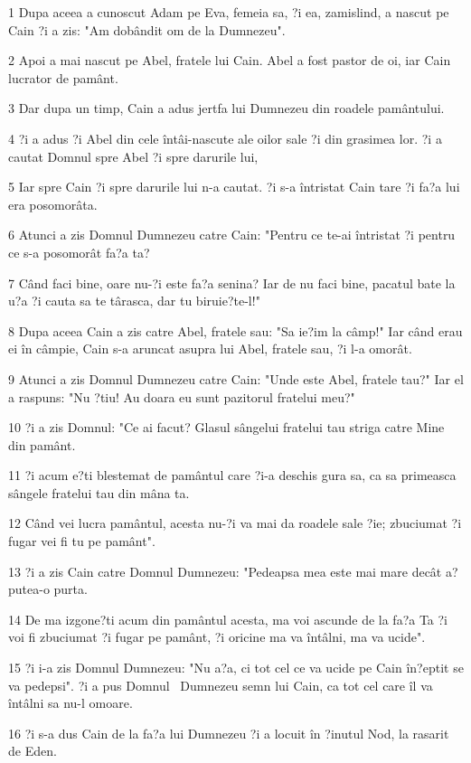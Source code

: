 \par 1 Dupa aceea a cunoscut Adam pe Eva, femeia sa, ?i ea, zamislind, a nascut pe Cain ?i a zis: "Am dobândit om de la Dumnezeu".
\par 2 Apoi a mai nascut pe Abel, fratele lui Cain. Abel a fost pastor de oi, iar Cain lucrator de pamânt.
\par 3 Dar dupa un timp, Cain a adus jertfa lui Dumnezeu din roadele pamântului.
\par 4 ?i a adus ?i Abel din cele întâi-nascute ale oilor sale ?i din grasimea lor. ?i a cautat Domnul spre Abel ?i spre darurile lui,
\par 5 Iar spre Cain ?i spre darurile lui n-a cautat. ?i s-a întristat Cain tare ?i fa?a lui era posomorâta.
\par 6 Atunci a zis Domnul Dumnezeu catre Cain: "Pentru ce te-ai întristat ?i pentru ce s-a posomorât fa?a ta?
\par 7 Când faci bine, oare nu-?i este fa?a senina? Iar de nu faci bine, pacatul bate la u?a ?i cauta sa te târasca, dar tu biruie?te-l!"
\par 8 Dupa aceea Cain a zis catre Abel, fratele sau: "Sa ie?im la câmp!" Iar când erau ei în câmpie, Cain s-a aruncat asupra lui Abel, fratele sau, ?i l-a omorât.
\par 9 Atunci a zis Domnul Dumnezeu catre Cain: "Unde este Abel, fratele tau?" Iar el a raspuns: "Nu ?tiu! Au doara eu sunt pazitorul fratelui meu?"
\par 10 ?i a zis Domnul: "Ce ai facut? Glasul sângelui fratelui tau striga catre Mine din pamânt.
\par 11 ?i acum e?ti blestemat de pamântul care ?i-a deschis gura sa, ca sa primeasca sângele fratelui tau din mâna ta.
\par 12 Când vei lucra pamântul, acesta nu-?i va mai da roadele sale ?ie; zbuciumat ?i fugar vei fi tu pe pamânt".
\par 13 ?i a zis Cain catre Domnul Dumnezeu: "Pedeapsa mea este mai mare decât a? putea-o purta.
\par 14 De ma izgone?ti acum din pamântul acesta, ma voi ascunde de la fa?a Ta ?i voi fi zbuciumat ?i fugar pe pamânt, ?i oricine ma va întâlni, ma va ucide".
\par 15 ?i i-a zis Domnul Dumnezeu: "Nu a?a, ci tot cel ce va ucide pe Cain în?eptit se va pedepsi". ?i a pus Domnul  Dumnezeu semn lui Cain, ca tot cel care îl va întâlni sa nu-l omoare.
\par 16 ?i s-a dus Cain de la fa?a lui Dumnezeu ?i a locuit în ?inutul Nod, la rasarit de Eden.
